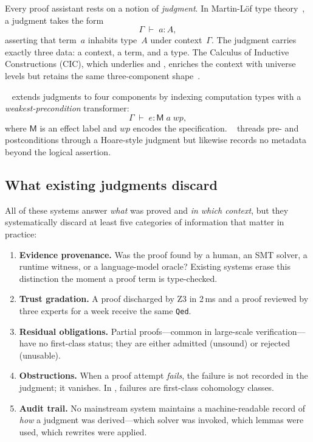 \documentclass[11pt]{article}
\begin{document}
Every proof assistant rests on a notion of \emph{judgment}.
In Martin-L\"of type theory~\cite{martinlof84}, a judgment takes the form
\[
  \Gamma \;\vdash\; a : A,
\]
asserting that term~$a$ inhabits type~$A$ under context~$\Gamma$.
The judgment carries exactly three data: a context, a term, and a type.
The Calculus of Inductive Constructions (CIC), which underlies \Coq{} and
\LEAN{}, enriches the context with universe levels but retains the same
three-component shape~\cite{coquand88,lean4}.

\Fstar{}~\cite{fstar} extends judgments to four components by indexing
computation types with a \emph{weakest-precondition} transformer:
\[
  \Gamma \;\vdash\; e : \mathsf{M}\;a\;\mathit{wp},
\]
where $\mathsf{M}$ is an effect label and $\mathit{wp}$ encodes the
specification.  \Dafny{}~\cite{dafny} threads pre- and postconditions
through a Hoare-style judgment but likewise records no metadata beyond
the logical assertion.

\subsection{What existing judgments discard}

All of these systems answer \emph{what} was proved and \emph{in which context},
but they systematically discard at least five categories of information that
matter in practice:

\begin{enumerate}[label=(\roman*)]
  \item \textbf{Evidence provenance.}  Was the proof found by a human, an SMT
        solver, a runtime witness, or a language-model oracle?  Existing
        systems erase this distinction the moment a proof term is type-checked.
  \item \textbf{Trust gradation.}  A proof discharged by Z3 in 2\,ms and a
        proof reviewed by three experts for a week receive the same
        \texttt{Qed}.
  \item \textbf{Residual obligations.}  Partial proofs---common in
        large-scale verification---have no first-class status; they are
        either admitted (unsound) or rejected (unusable).
  \item \textbf{Obstructions.}  When a proof attempt \emph{fails}, the failure
        is not recorded in the judgment; it vanishes.  In \JuGeo{}, failures
        are first-class cohomology classes.
  \item \textbf{Audit trail.}  No mainstream system maintains a
        machine-readable record of \emph{how} a judgment was derived---which
        solver was invoked, which lemmas were used, which rewrites were
        applied.
\end{enumerate}
\end{document}
